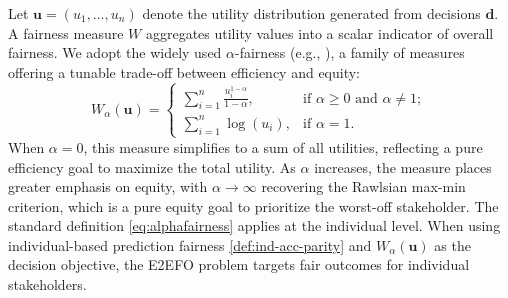\documentclass[ijoc,sglanonrev]{informs4}
\begin{document}
Let $\mathbf{u} = (u_1,\ldots,u_n)$ denote the utility distribution generated from decisions $\mathbf{d}$. A fairness measure $W$ aggregates utility values into a scalar indicator of overall fairness. We adopt the widely used $\alpha$-fairness (e.g., \cite{mo2000fair,bertsimas2011price}), a family of measures offering a tunable trade-off between efficiency and equity:
\begin{equation} \label{eq:alphafairness}
    W_{\alpha}(\mathbf{u}) = 
\begin{cases}
    \sum_{i=1}^{n} \frac{u_i^{1 - \alpha}}{1-\alpha}, & \text{if } \alpha \geq 0 \text{ and } \alpha \neq 1; \\
    \sum_{i=1}^{n} \log(u_i), & \text{if } \alpha = 1.
\end{cases}
\end{equation}
When $\alpha = 0$, this measure simplifies to a sum of all utilities, reflecting a pure efficiency goal to maximize the total utility. As $\alpha$ increases, the measure places greater emphasis on equity, with $\alpha \to \infty$ recovering the Rawlsian max-min criterion, which is a pure equity goal to prioritize the worst-off stakeholder. The standard definition \eqref{eq:alphafairness} applies at the individual level. When using individual-based prediction fairness \eqref{def:ind-acc-parity} and $W_{\alpha}(\mathbf{u})$ as the decision objective, the E2EFO problem targets fair outcomes for individual stakeholders.
\end{document}
